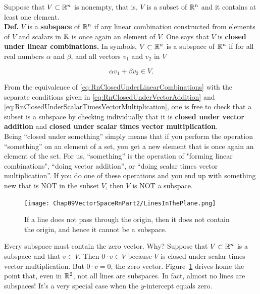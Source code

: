 \begin{tcolorbox}[sharp corners, colback=green!30, colframe=green!80!blue, title=\textbf{\Large Subspace of $\boldsymbol{\real^n}$}]


Suppose that $V \subset \mathbb R^n$ is nonempty, that is, $V$ is a subset of $\mathbb R^n$ and it contains at least one element.\\

\textbf{Def.} $V$ is a \textbf{subspace} of $\mathbb R^n$ if any linear combination constructed from elements of $V$ and scalars in $\mathbb R$ is once again an element of $V$. One says that $V$ is \textbf{closed under linear combinations.} In symbols, $V \subset \mathbb R^n$ is a subspace of $\mathbb R^n$ if for all real numbers $\alpha$ and $\beta$, and all vectors $v_1$ and $v_2$ in $V$

\begin{equation}
    \label{eq:SubspaceClosedUnderLinearCombinations}
  \boxed{ \alpha  v_1 + \beta v_2 \in V.}
    \end{equation}
    
From the equivalence of \eqref{eq:RnClosedUnderLinearCombinations} with the separate conditions given in \eqref{eq:RnClosedUnderVectorAddition} and \eqref{eq:RnClosedUnderScalarTimesVectorMultiplication}, one is free to check that a subset is a subspace by checking individually that it is \textbf{closed under vector addition} and \textbf{closed under scalar times vector multiplication}.\\

Being ``closed under something'' simply means that if you perform the operation ``something'' on an element of a set, you get a new element that is once again an element of the set. For us, ``something'' is the operation of "forming linear combinations", 
``doing vector addition'', or ``doing scalar times vector multiplication''. If you do one of these operations and you end up with something new that is NOT in the subset $V$, then $V$ is NOT a subspace. 
\end{tcolorbox}

\begin{figure}[h!]
\centering
\texttt{[image: Chap09VectorSpaceRnPart2/LinesInThePlane.png]}
\caption{If a line does not pass through the origin, then it does not contain the origin, and hence it cannot be a subspace.}
\label{fig:LinesAreNotAlwaysSubspaces}
\end{figure}

\begin{tcolorbox}[title=\textbf{Easy First Test for Subspaces:}]
  Every subspace must contain the zero vector. Why? Suppose that $V \subset \mathbb R^n$ is a subspace and that $v\in V$. Then $0 \cdot v \in V$ because $V$ is closed under scalar times vector multiplication. But $0 \cdot v = 0$, the zero vector. Figure~\ref{fig:LinesAreNotAlwaysSubspaces} drives home the point that, even in $\mathbb R^2$, not all lines are subspaces. In fact, almost no lines are subspaces! It's a very special case when the $y$-intercept equals zero.
\end{tcolorbox}



